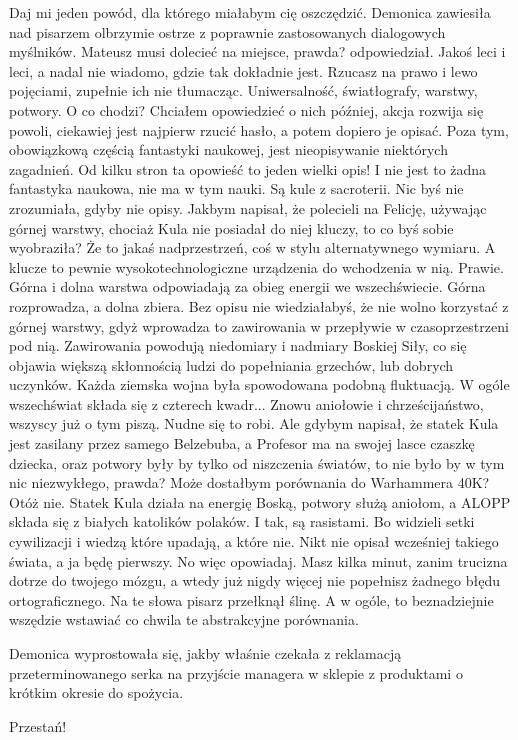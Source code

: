 \begin{dialogue}
\ds{} Daj mi jeden powód, dla którego miałabym cię oszczędzić. \dm{} Demonica zawiesiła nad pisarzem olbrzymie ostrze z poprawnie zastosowanych dialogowych myślników.
\ds{} Mateusz musi dolecieć na miejsce, prawda? \dm{} odpowiedział.
\ds{} Jakoś leci i leci, a nadal nie wiadomo, gdzie tak dokładnie jest. Rzucasz na prawo i lewo pojęciami, zupełnie ich nie tłumacząc.
Uniwersalność, światłografy, warstwy, potwory. O co chodzi?
\ds{} Chciałem opowiedzieć o nich później, akcja rozwija się powoli, ciekawiej jest najpierw rzucić hasło, a potem dopiero je opisać.
Poza tym, obowiązkową częścią fantastyki naukowej, jest nieopisywanie niektórych zagadnień.
\ds{} Od kilku stron ta opowieść to jeden wielki opis! I nie jest to żadna fantastyka naukowa, nie ma w tym nauki. Są kule z sacroterii.
\ds{} Nic byś nie zrozumiała, gdyby nie opisy. Jakbym napisał, że polecieli na Felicję, używając górnej warstwy, chociaż Kula nie posiadał do niej kluczy, to co byś sobie wyobraziła?
\ds{} Że to jakaś nadprzestrzeń, coś w stylu alternatywnego wymiaru. A klucze to pewnie wysokotechnologiczne urządzenia do wchodzenia w nią.
\ds{} Prawie. Górna i dolna warstwa odpowiadają za obieg energii we wszechświecie. Górna rozprowadza, a dolna zbiera.
Bez opisu nie wiedziałabyś, że nie wolno korzystać z górnej warstwy, gdyż wprowadza to zawirowania w przepływie w czasoprzestrzeni pod nią.
Zawirowania powodują niedomiary i nadmiary Boskiej Siły, co się objawia większą skłonnością ludzi do popełniania grzechów, lub dobrych uczynków.
Każda ziemska wojna była spowodowana podobną fluktuacją.
W ogóle wszechświat składa się z czterech kwadr...
\ds{} Znowu aniołowie i chrześcijaństwo, wszyscy już o tym piszą. Nudne się to robi.
\ds{} Ale gdybym napisał, że statek Kula jest zasilany przez samego Belzebuba, a Profesor ma na swojej lasce czaszkę dziecka, oraz potwory były by tylko od niszczenia światów, to nie było by w tym nic niezwykłego, prawda? Może dostałbym porównania do Warhammera 40K? Otóż nie. Statek Kula działa na energię Boską, potwory służą aniołom, a ALOPP składa się z białych katolików polaków. 
I tak, są rasistami. Bo widzieli setki cywilizacji i wiedzą które upadają, a które nie.
Nikt nie opisał wcześniej takiego świata, a ja będę pierwszy.
\ds{} No więc opowiadaj. Masz kilka minut, zanim trucizna dotrze do twojego mózgu, a wtedy już nigdy więcej nie popełnisz żadnego błędu ortograficznego. 
\dm{} Na te słowa pisarz przełknął ślinę. \dm{}
A w ogóle, to beznadziejnie wszędzie wstawiać co chwila te abstrakcyjne porównania.
\end{dialogue}
Demonica wyprostowała się, jakby właśnie czekała z reklamacją przeterminowanego serka na przyjście managera w sklepie z produktami o krótkim okresie do spożycia.
\begin{dialogue}
\ds{} Przestań!
\end{dialogue}

